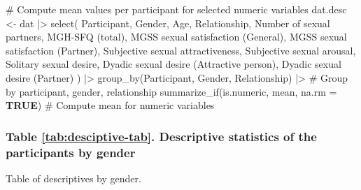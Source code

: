 \documentclass[
  bookmarksnumbered]{article}
\newenvironment{Shaded}{\begin{snugshade}}{\end{snugshade}}
\newcommand{\AttributeTok}[1]{\textcolor[rgb]{0.80,0.80,0.80}{#1}}
\newcommand{\CommentTok}[1]{\textcolor[rgb]{0.50,0.62,0.50}{#1}}
\newcommand{\ConstantTok}[1]{\textcolor[rgb]{0.86,0.64,0.64}{\textbf{#1}}}
\newcommand{\FunctionTok}[1]{\textcolor[rgb]{0.94,0.94,0.56}{#1}}
\newcommand{\NormalTok}[1]{\textcolor[rgb]{0.80,0.80,0.80}{#1}}
\newcommand{\OtherTok}[1]{\textcolor[rgb]{0.94,0.94,0.56}{#1}}
\newcommand{\SpecialCharTok}[1]{\textcolor[rgb]{0.86,0.64,0.64}{#1}}
\newcommand{\StringTok}[1]{\textcolor[rgb]{0.80,0.58,0.58}{#1}}
\begin{document}
\begin{Shaded}
\begin{Highlighting}[]
\CommentTok{\# Compute mean values per participant for selected numeric variables}
\NormalTok{dat.desc }\OtherTok{\textless{}{-}}\NormalTok{ dat }\SpecialCharTok{|\textgreater{}}
  \FunctionTok{select}\NormalTok{(}
\NormalTok{    Participant, Gender, Age, Relationship, }\StringTok{\textasciigrave{}}\AttributeTok{Number of sexual partners}\StringTok{\textasciigrave{}}\NormalTok{,}
    \StringTok{\textasciigrave{}}\AttributeTok{MGH{-}SFQ (total)}\StringTok{\textasciigrave{}}\NormalTok{,}
    \StringTok{\textasciigrave{}}\AttributeTok{MGSS sexual satisfaction (General)}\StringTok{\textasciigrave{}}\NormalTok{, }\StringTok{\textasciigrave{}}\AttributeTok{MGSS sexual satisfaction (Partner)}\StringTok{\textasciigrave{}}\NormalTok{,}
    \StringTok{\textasciigrave{}}\AttributeTok{Subjective sexual attractiveness}\StringTok{\textasciigrave{}}\NormalTok{, }\StringTok{\textasciigrave{}}\AttributeTok{Subjective sexual arousal}\StringTok{\textasciigrave{}}\NormalTok{,}
    \StringTok{\textasciigrave{}}\AttributeTok{Solitary sexual desire}\StringTok{\textasciigrave{}}\NormalTok{,}
    \StringTok{\textasciigrave{}}\AttributeTok{Dyadic sexual desire (Attractive person)}\StringTok{\textasciigrave{}}\NormalTok{, }\StringTok{\textasciigrave{}}\AttributeTok{Dyadic sexual desire (Partner)}\StringTok{\textasciigrave{}}
\NormalTok{  ) }\SpecialCharTok{|\textgreater{}}
  \FunctionTok{group\_by}\NormalTok{(Participant, Gender, Relationship) }\SpecialCharTok{|\textgreater{}} \CommentTok{\# Group by participant, gender, relationship}
  \FunctionTok{summarize\_if}\NormalTok{(is.numeric, mean, }\AttributeTok{na.rm =} \ConstantTok{TRUE}\NormalTok{) }\CommentTok{\# Compute mean for numeric variables}
\end{Highlighting}
\end{Shaded}

\subsubsection{Table \ref{tab:desciptive-tab}. Descriptive statistics of the participants by gender}\label{table-reftabdesciptive-tab.-descriptive-statistics-of-the-participants-by-gender}

Table of descriptives by gender.
\end{document}
